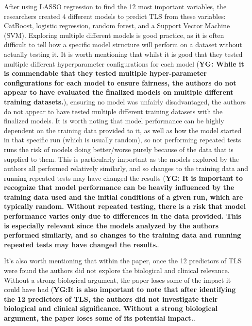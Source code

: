 \documentclass{article}
\begin{document}
After using LASSO regression to find the 12 most important variables, the researchers created 4 different models to predict TLS from these variables: CatBoost, logistic regression, random forest, and a Support Vector Machine (SVM). Exploring multiple different models is good practice, as it is often difficult to tell how a specific model structure will perform on a dataset without actually testing it. It is worth mentioning that whilst it is good that they tested multiple different hyperparameter configurations for each model (\textbf{YG: While it is commendable that they tested multiple hyper-parameter configurations for each model to ensure fairness, the authors do not appear to have evaluated the finalized models on multiple different training datasets.}), ensuring no model was unfairly disadvantaged, the authors do not appear to have tested multiple different training
datasets with the finalized models. It is worth noting that model performance can be highly dependent on the training data provided to it, as well as how the model started in that specific run (which is usually random), so not performing repeated tests runs the risk of models doing better/worse purely because of the data that is supplied to them. This is particularly important as the models explored by the authors all performed relatively similarly, and so changes to the training data and running repeated tests may have changed the results (\textbf{YG: It is important to recognize that model performance can be heavily influenced by the training data used and the initial conditions of a given run, which are typically random. Without repeated testing, there is a risk that model performance varies only due to differences in the data provided. This is especially relevant since the models analyzed by the authors performed similarly, and so changes to the training data and running repeated tests may have changed the results.}.

It's also worth mentioning that within the paper, once the 12 predictors of TLS were found the authors did not explore the biological and clinical relevance. Without a strong biological argument, the paper loses some of the impact it could have had (\textbf{YG:It is also important to note that after identifying the 12 predictors of TLS, the authors did not investigate their biological and clinical significance. Without a strong biological argument, the paper loses some of its potential impact.}.
\end{document}
